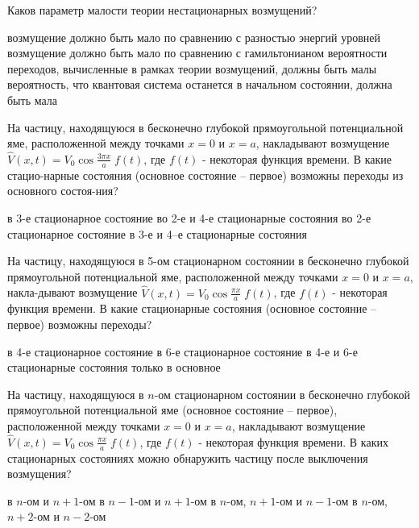 \documentclass[11pt,a4paper]{exam}
\begin{document}
\begin{questions}
\question Каков параметр малости теории нестационарных возмущений?
\begin{choices}
\choice возмущение должно быть мало по сравнению с разностью энергий уровней
\choice возмущение должно быть мало по сравнению с гамильтонианом
\choice вероятности переходов, вычисленные в рамках теории возмущений, должны быть малы
\choice вероятность, что квантовая система останется в начальном состоянии, должна быть мала 
\end{choices}

\question На частицу, находящуюся в бесконечно глубокой прямоугольной потенциальной яме, расположенной между точками $x = 0$ и $x = a$, накладывают возмущение $\hat V(x,t) = {V_0}\cos \frac{{3\pi x}}{a}\;f(t)$, где $f(t)$ - некоторая функция времени. В какие стацио-нарные состояния (основное состояние – первое) возможны переходы из основного состоя-ния? 
\begin{choices}
\choice в 3-е стационарное состояние     
\choice во 2-е и 4-е стационарные состояния
\choice во 2-е стационарное состояние    
\choice в 3-е и 4–е стационарные состояния
\end{choices}

\question На частицу, находящуюся в 5-ом стационарном состоянии в бесконечно глубокой прямоугольной потенциальной яме, расположенной между точками $x = 0$ и $x = a$, накла-дывают возмущение $\hat V(x,t) = {V_0}\cos \frac{{\pi x}}{a}\;f(t)$, где $f(t)$ - некоторая функция времени. В какие стационарные состояния (основное состояние – первое) возможны переходы? 
\begin{choices}
\choice в 4-е стационарное состояние     
\choice в 6-е стационарное состояние
\choice в 4-е и 6-е стационарные состояния  
\choice только в основное
\end{choices}

\question На частицу, находящуюся в $n$-ом стационарном состоянии в бесконечно глубокой прямоугольной потенциальной яме (основное состояние – первое), расположенной между точками $x = 0$ и $x = a$, накладывают возмущение $\hat V(x,t) = {V_0}\cos \frac{{\pi x}}{a}\;f(t)$, где $f(t)$ - некоторая функция времени. В каких стационарных состояниях можно обнаружить частицу после выключения возмущения? 
\begin{choices}
\choice в $n$-ом и $n + 1$-ом            
\choice в $n - 1$-ом и $n + 1$-ом
\choice в $n$-ом, $n + 1$-ом и $n - 1$-ом      
\choice в $n$-ом, $n + 2$-ом и $n - 2$-ом
\end{choices}


\end{questions}
\end{document}
